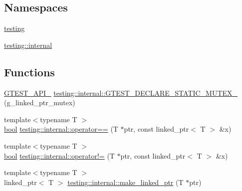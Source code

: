 \subsection*{Namespaces}
\begin{DoxyCompactItemize}
\item 
 \hyperlink{namespacetesting}{testing}
\item 
 \hyperlink{namespacetesting_1_1internal}{testing\+::internal}
\end{DoxyCompactItemize}
\subsection*{Functions}
\begin{DoxyCompactItemize}
\item 
\hyperlink{gtest-port_8h_aa73be6f0ba4a7456180a94904ce17790}{G\+T\+E\+S\+T\+\_\+\+A\+P\+I\+\_\+} \hyperlink{namespacetesting_1_1internal_ad7c5625384cf5f6b714188f274537ef6}{testing\+::internal\+::\+G\+T\+E\+S\+T\+\_\+\+D\+E\+C\+L\+A\+R\+E\+\_\+\+S\+T\+A\+T\+I\+C\+\_\+\+M\+U\+T\+E\+X\+\_\+} (g\+\_\+linked\+\_\+ptr\+\_\+mutex)
\item 
{\footnotesize template$<$typename T $>$ }\\\hyperlink{classbool}{bool} \hyperlink{namespacetesting_1_1internal_ad1cb54a206a209ddace17a05359d38ae}{testing\+::internal\+::operator==} (T $\ast$ptr, const linked\+\_\+ptr$<$ T $>$ \&x)
\item 
{\footnotesize template$<$typename T $>$ }\\\hyperlink{classbool}{bool} \hyperlink{namespacetesting_1_1internal_a6910869259f8f31825b471e9190fa09a}{testing\+::internal\+::operator!=} (T $\ast$ptr, const linked\+\_\+ptr$<$ T $>$ \&x)
\item 
{\footnotesize template$<$typename T $>$ }\\linked\+\_\+ptr$<$ T $>$ \hyperlink{namespacetesting_1_1internal_a0d79fad1f772844eff35dfe955f24fd6}{testing\+::internal\+::make\+\_\+linked\+\_\+ptr} (T $\ast$ptr)
\end{DoxyCompactItemize}

